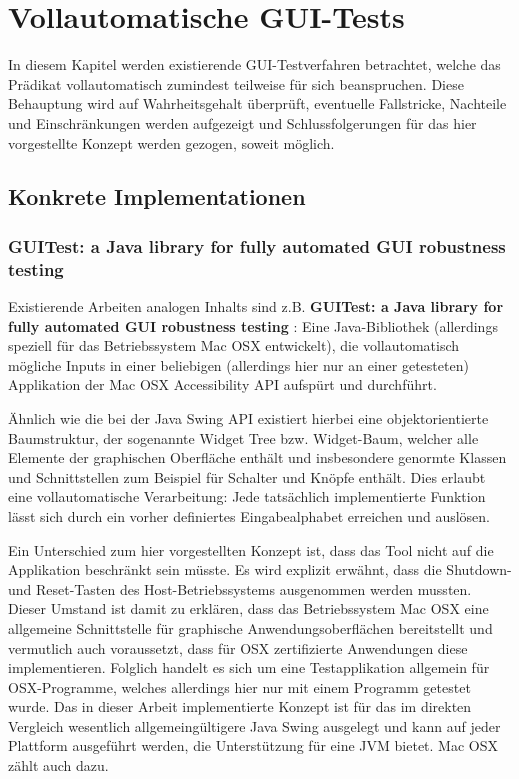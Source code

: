 \chapter{\glqq{}Vollautomatische\grqq{} GUI-Tests}\label{chapter:introfullautoguitesting}


In diesem Kapitel werden existierende GUI-Testverfahren betrachtet, welche das Prädikat
\glqq{}vollautomatisch\grqq{} zumindest teilweise für sich beanspruchen. Diese Behauptung wird
auf Wahrheitsgehalt überprüft, eventuelle Fallstricke, Nachteile und Einschränkungen werden aufgezeigt
und Schlussfolgerungen für das hier vorgestellte Konzept werden gezogen, soweit möglich.


\section{Konkrete Implementationen}\label{section:fullautoguitestsimpl}


\subsection{GUITest: a Java library for fully automated GUI robustness testing}

Existierende Arbeiten analogen Inhalts sind z.B. \textbf{\glqq{}GUITest: a Java library for fully automated
GUI robustness testing\grqq{}} \cite{GUITestBauersfeld}: Eine Java-Bibliothek 
(allerdings speziell für das Betriebssystem Mac OSX entwickelt), die
vollautomatisch mögliche Inputs in einer beliebigen (allerdings hier nur an einer getesteten)
Applikation der \glqq{}Mac OSX Accessibility API\grqq{} aufspürt und durchführt.

Ähnlich wie die bei der Java Swing API existiert hierbei eine objektorientierte Baumstruktur,
der sogenannte \glqq{}Widget Tree\grqq{} bzw. Widget-Baum, welcher alle Elemente der graphischen Oberfläche enthält
und insbesondere genormte Klassen und Schnittstellen zum Beispiel für Schalter
und Knöpfe enthält. Dies erlaubt eine vollautomatische Verarbeitung:
Jede tatsächlich implementierte Funktion lässt sich durch ein vorher definiertes
\glqq{}Eingabealphabet\grqq{} erreichen und auslösen.

Ein Unterschied zum
hier vorgestellten Konzept ist, dass das Tool nicht auf die Applikation beschränkt sein müsste. Es wird
explizit erwähnt, dass die Shutdown- und Reset-Tasten des Host-Betriebssystems ausgenommen werden
mussten. Dieser Umstand ist damit zu erklären, dass das Betriebssystem Mac OSX eine allgemeine
Schnittstelle für graphische Anwendungsoberflächen bereitstellt und vermutlich auch voraussetzt,
dass für OSX zertifizierte Anwendungen diese implementieren. Folglich handelt es sich um eine
Testapplikation allgemein für OSX-Programme, welches allerdings hier nur mit einem Programm
getestet wurde. Das in dieser Arbeit implementierte Konzept ist für das im direkten Vergleich 
wesentlich allgemeingültigere Java Swing ausgelegt und kann auf jeder Plattform ausgeführt werden, 
die Unterstützung für eine JVM bietet. Mac OSX zählt auch dazu.

